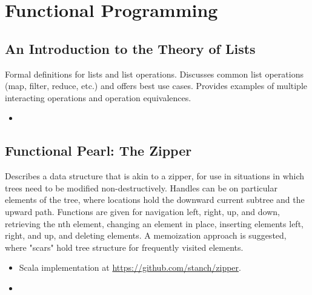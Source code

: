 \chapter {Functional Programming}

\section {An Introduction to the Theory of Lists \cite{bird1987introduction}}
Formal definitions for lists and list operations. Discusses common list
operations (map, filter, reduce, etc.) and offers best use cases. Provides
examples of multiple interacting operations and operation equivalences.
\begin{itemize}
    \item {}
\end{itemize}

\section {Functional Pearl: The Zipper \cite{huet1997zipper}}
Describes a data structure that is akin to a zipper, for use in situations in
which trees need to be modified non-destructively. Handles can be on particular
elements of the tree, where locations hold the downward current subtree and the
upward path. Functions are given for navigation left, right, up, and down,
retrieving the nth element, changing an element in place, inserting elements
left, right, and up, and deleting elements. A memoization approach is suggested,
where "scars" hold tree structure for frequently visited elements.
\begin{itemize}
    \item Scala implementation at \href{https://github.com/stanch/zipper}{https://github.com/stanch/zipper}.
    \item {}
\end{itemize}
